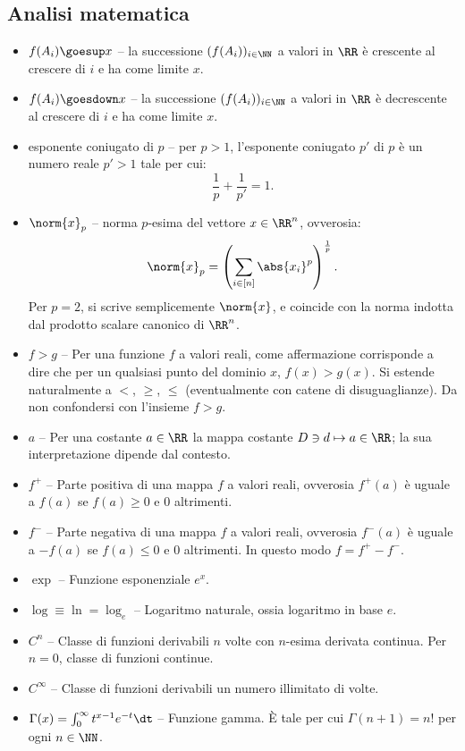 \begin{multicols*}{2}
    \section*{Analisi matematica}

    \begin{itemize}
        \item $f(A_i) \goesup x$ -- la successione $(f(A_i))_{i \in \NN}$ a valori
        in $\RR$ è crescente al crescere di $i$ e ha come limite $x$.
        \item $f(A_i) \goesdown x$ -- la successione $(f(A_i))_{i \in \NN}$ a valori
        in $\RR$ è decrescente al crescere di $i$ e ha come limite $x$.
        \item esponente coniugato di $p$ -- per $p > 1$, l'esponente coniugato
        $p'$ di $p$ è un numero reale $p' > 1$ tale per cui:
        \[
            \frac{1}{p} + \frac{1}{p'} = 1.
        \]
        \item $\norm{x}_p$ -- norma $p$-esima del vettore $x \in \RR^n$, ovverosia:
        \[
            \norm{x}_p = \left(\sum_{i \in [n]} \abs{x_i}^p\right)^\frac{1}{p}.
        \]
        Per $p = 2$, si scrive semplicemente $\norm{x}$, e coincide con la norma
        indotta dal prodotto scalare canonico di $\RR^n$.
        \item $f > g$ -- Per una funzione $f$ a valori reali, come affermazione
        corrisponde a dire che per un qualsiasi punto del dominio $x$, $f(x) > g(x)$. Si estende naturalmente a $<$, $\geq$, $\leq$ (eventualmente con
        catene di disuguaglianze). Da non
        confondersi con l'insieme $f > g$.
        \item $a$ -- Per una costante $a \in \RR$ la mappa costante $D \ni d \mapsto a \in \RR$;
        la sua interpretazione dipende dal contesto.
        \item $f^+$ -- Parte positiva di una mappa $f$ a valori reali, ovverosia
        $f^+(a)$ è uguale a $f(a)$ se $f(a) \geq 0$ e $0$ altrimenti.
        \item $f^-$ -- Parte negativa di una mappa $f$ a valori reali, ovverosia
        $f^-(a)$ è uguale a $-f(a)$ se $f(a) \leq 0$ e $0$ altrimenti. In questo
        modo $f = f^+ - f^-$.
        \item $\exp$ -- Funzione esponenziale $e^x$.
        \item $\log \equiv \ln = \log_e$ -- Logaritmo naturale, ossia logaritmo in base $e$.
        \item $C^n$ -- Classe di funzioni derivabili $n$ volte con $n$-esima derivata continua. Per $n = 0$, classe di funzioni continue.
        \item $C^\infty$ -- Classe di funzioni derivabili un numero illimitato di volte.
        \item $\Gamma(x) = \int_0^\infty t^{x-1} e^{-t} \dt$ -- Funzione gamma. È tale per cui $\Gamma(n+1) = n!$ per ogni $n \in \NN$. 
    \end{itemize}


\end{multicols*}
